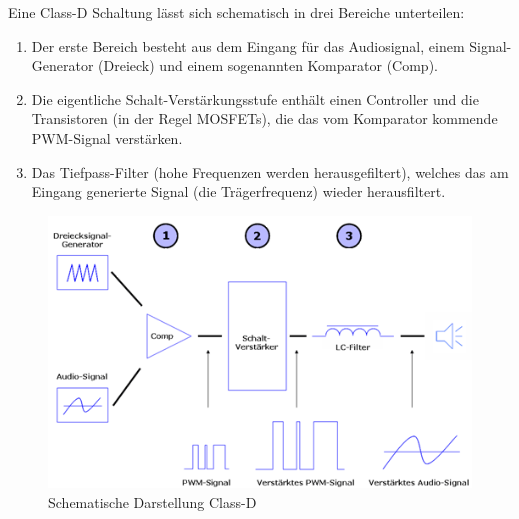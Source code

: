 Eine Class-D Schaltung lässt sich schematisch in drei Bereiche unterteilen:
\begin{enumerate}
	\item Der erste Bereich besteht aus dem Eingang für das Audiosignal, einem Signal-Generator (Dreieck) und einem sogenannten Komparator (Comp).
	\item Die eigentliche Schalt-Verstärkungsstufe enthält einen Controller und die Transistoren (in der Regel MOSFETs), die das vom Komparator kommende PWM-Signal verstärken.
	\item Das Tiefpass-Filter (hohe Frequenzen werden herausgefiltert), welches das am Eingang generierte Signal (die Trägerfrequenz) wieder herausfiltert.	
\end{enumerate}
\cite{fairaudio-classd}
\begin{figure}[H]
	\centering
	\includegraphics[width=.9\linewidth]{images/technische_grundlagen/class-d-schematisch.png}
	\caption{Schematische Darstellung Class-D \cite{fairaudio-classd}}
\end{figure}
